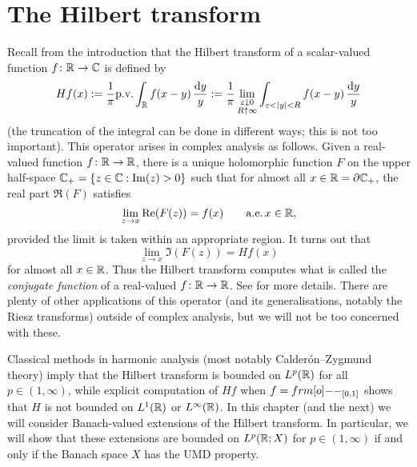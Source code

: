 \section{The Hilbert transform}

Recall from the introduction that the Hilbert transform of a scalar-valued function $f \colon \mathbb{R} \rightarrow \mathbb{C}$ is defined by
\begin{equation*}
  Hf(x) := \frac{1}{\pi} \mathrm{p. v.} \int_{\mathbb{R}} f(x-y) \, \frac{\mathrm{d} y}{y} := \frac{1}{\pi} \lim_{\substack{\varepsilon \downarrow 0 \\ R \uparrow \infty}} \int_{\varepsilon < |y| < R} f(x-y) \, \frac{\mathrm{d} y}{y}
\end{equation*}
(the truncation of the integral can be done in different ways; this is not too important).
This operator arises in complex analysis as follows.
Given a real-valued function $f \colon \mathbb{R} \rightarrow \mathbb{R}$, there is a unique holomorphic function $F$ on the upper half-space $\mathbb{C}_{+} = \{z \in \mathbb{C} : \mathrm{Im}(z) > 0\}$ such that for almost all $x \in \mathbb{R} = \partial \mathbb{C}_{+}$, the real part $\Re(F)$ satisfies
\begin{equation*}
  \lim_{z \to x} \mathrm{Re}(F(z)) = f(x) \qquad \mathrm{a.e.} \,  x \in \mathbb{R},
\end{equation*}
provided the limit is taken within an appropriate region.
It turns out that
\begin{equation*}
  \lim_{z \to x} \Im(F(z)) = Hf(x)
\end{equation*}
for almost all $x \in \mathbb{R}$.
Thus the Hilbert transform computes what is called the \emph{conjugate function} of a real-valued $f \colon \mathbb{R} \rightarrow \mathbb{R}$.
See \cite[.2]{grafakos} for more details.
There are plenty of other applications of this operator (and its generalisations, notably the Riesz transforms) outside of complex analysis, but we will not be too concerned with these.

Classical methods in harmonic analysis (most notably Calder\'on--Zygmund theory) imply that the Hilbert transform is bounded on $L^p(\mathbb{R})$ for all $p \in (1,\infty)$, while explicit computation of $Hf$ when $f = \1_{[0,1]}$ shows that $H$ is not bounded on $L^1(\mathbb{R})$ or $L^\infty(\mathbb{R})$.
In this chapter (and the next) we will consider Banach-valued extensions of the Hilbert transform.
In particular, we will show that these extensions are bounded on $L^p(\mathbb{R};X)$ for $p \in (1,\infty)$ if and only if the Banach space $X$ has the UMD property.

